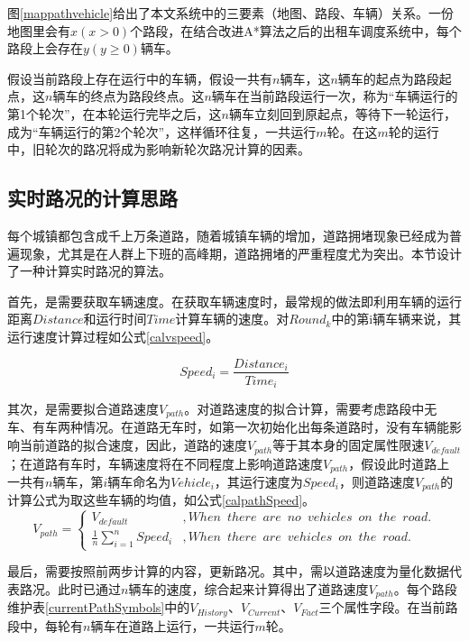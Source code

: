 图\ref{mappathvehicle}给出了本文系统中的三要素（地图、路段、车辆）关系。一份地图里会有$x(x>0)$个路段，在结合改进A*算法之后的出租车调度系统中，每个路段上会存在$y(y\ge 0)$辆车。

假设当前路段上存在运行中的车辆，假设一共有$n$辆车，这$n$辆车的起点为路段起点，这$n$辆车的终点为路段终点。这$n$辆车在当前路段运行一次，称为``车辆运行的第1个轮次”，在本轮运行完毕之后，这$n$辆车立刻回到原起点，等待下一轮运行，成为``车辆运行的第2个轮次”，这样循环往复，一共运行$m$轮。在这$m$轮的运行中，旧轮次的路况将成为影响新轮次路况计算的因素。

\subsection{实时路况的计算思路}
\label{subsection-calPathSituation}

每个城镇都包含成千上万条道路，随着城镇车辆的增加，道路拥堵现象已经成为普遍现象，尤其是在人群上下班的高峰期，道路拥堵的严重程度尤为突出。本节设计了一种计算实时路况的算法。

首先，是需要获取车辆速度。在获取车辆速度时，最常规的做法即利用车辆的运行距离$Distance$和运行时间$Time$计算车辆的速度。对$Round_k$中的第i辆车辆来说，其运行速度计算过程如公式\ref{calvspeed}。

\begin{equation}
    Speed_i = \frac{Distance_i}{Time_i} 
\label{calvspeed}
\end{equation}

其次，是需要拟合道路速度$V_{path}$。对道路速度的拟合计算，需要考虑路段中无车、有车两种情况。在道路无车时，如第一次初始化出每条道路时，没有车辆能影响当前道路的拟合速度，因此，道路的速度$V_{path}$等于其本身的固定属性限速$V_{default}$；在道路有车时，车辆速度将在不同程度上影响道路速度$V_{path}$，假设此时道路上一共有$n$辆车，第$i$辆车命名为$Vehicle_i$，其运行速度为$Speed_i$，则道路速度$V_{path}$的计算公式为取这些车辆的均值，如公式\ref{calpathSpeed}。
\begin{equation}
V_{path} =
  \left\{\begin{matrix}
  V_{default} & ,When\enspace there\enspace are\enspace no\enspace vehicles\enspace on\enspace the\enspace road. \\
  \frac{1}{n} {\sum_{i=1}^{n}Speed_i} & ,When\enspace there\enspace are\enspace vehicles\enspace on\enspace the\enspace road.
\end{matrix}\right.
\label{calpathSpeed}
\end{equation}

最后，需要按照前两步计算的内容，更新路况。其中，需以道路速度为量化数据代表路况。此时已通过$n$辆车的速度，综合起来计算得出了道路速度$V_{path}$。每个路段维护表\ref{currentPathSymbols}中的$V_{History}$、$V_{Current}$、$V_{Fact}$三个属性字段。在当前路段中，每轮有$n$辆车在道路上运行，一共运行$m$轮。


